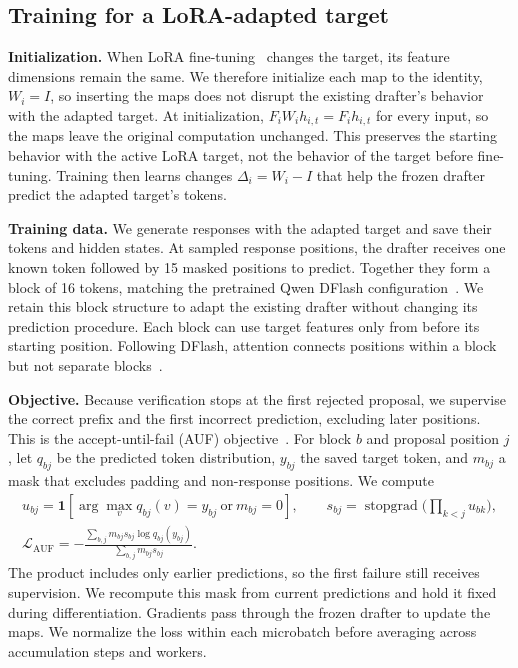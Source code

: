 

\subsection{Training for a LoRA-adapted target}
\label{sec:method-auf}
\textbf{Initialization.} When LoRA fine-tuning~\citep{hu2022lora} changes the target, its feature dimensions remain the same. We therefore initialize each map to the identity, $W_i=I$, so inserting the maps does not disrupt the existing drafter's behavior with the adapted target. At initialization, $F_iW_ih_{i,t}=F_ih_{i,t}$ for every input, so the maps leave the original computation unchanged. This preserves the starting behavior with the active LoRA target, not the behavior of the target before fine-tuning. Training then learns changes $\Delta_i=W_i-I$ that help the frozen drafter predict the adapted target's tokens.

\textbf{Training data.} We generate responses with the adapted target and save their tokens and hidden states. At sampled response positions, the drafter receives one known token followed by 15 masked positions to predict. Together they form a block of 16 tokens, matching the pretrained Qwen DFlash configuration~\citep{chen2026dflash}. We retain this block structure to adapt the existing drafter without changing its prediction procedure. Each block can use target features only from before its starting position. Following DFlash, attention connects positions within a block but not separate blocks~\citep{chen2026dflash}.

\textbf{Objective.} Because verification stops at the first rejected proposal, we supervise the correct prefix and the first incorrect prediction, excluding later positions. This is the accept-until-fail (AUF) objective~\citep{yang2026specauf}. For block $b$ and proposal position $j$, let $q_{bj}$ be the predicted token distribution, $y_{bj}$ the saved target token, and $m_{bj}$ a mask that excludes padding and non-response positions. We compute
\begin{equation}
 \begin{gathered}
 u_{bj}=\mathbf 1\!\left[\arg\max_v q_{bj}(v)=y_{bj}\ \text{or}\ m_{bj}=0\right],
 \qquad s_{bj}=\operatorname{stopgrad}\bigl({\textstyle\prod_{k<j}u_{bk}}\bigr),\\
 \mathcal L_{\mathrm{AUF}}
 =-\frac{\sum_{b,j}m_{bj}s_{bj}\log q_{bj}(y_{bj})}
 {\sum_{b,j}m_{bj}s_{bj}}.
 \end{gathered}
 \label{eq:auf-method}
\end{equation}
The product includes only earlier predictions, so the first failure still receives supervision. We recompute this mask from current predictions and hold it fixed during differentiation. Gradients pass through the frozen drafter to update the maps. We normalize the loss within each microbatch before averaging across accumulation steps and workers.

